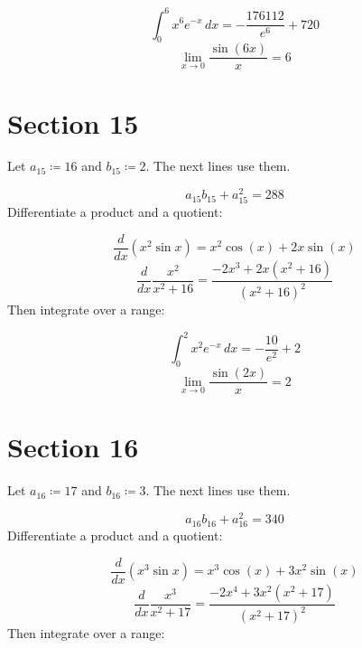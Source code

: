 \documentclass[11pt,a4paper]{article}
\theoremstyle{plain}
\theoremstyle{definition}
\theoremstyle{remark}
\begin{document}
\begin{equation*}
  \int_0^{6} x^{6} e^{-x} \, dx = -\frac{176112}{e^{6}} + 720
\end{equation*}
\begin{equation*}
  \lim_{x \to 0} \frac{\sin(6 x)}{x} = 6
\end{equation*}
\section*{Section 15}

Let $a_{15} \coloneqq  16$ and $b_{15} \coloneqq  2$. The next lines use them.

\begin{equation*}
  a_{15} b_{15} + a_{15}^2 = 288
\end{equation*}
Differentiate a product and a quotient:

\begin{equation*}
  \frac{d}{dx} \left( x^{2} \sin x \right) = x^{2} \cos\left(x\right) + 2 x \sin\left(x\right)
\end{equation*}
\begin{equation*}
  \frac{d}{dx} \frac{x^{2}}{x^2 + 16} = \frac{-2 x^{3} + 2 x \left(x^{2} + 16\right)}{\left(x^{2} + 16\right)^{2}}
\end{equation*}
Then integrate over a range:

\begin{equation*}
  \int_0^{2} x^{2} e^{-x} \, dx = -\frac{10}{e^{2}} + 2
\end{equation*}
\begin{equation*}
  \lim_{x \to 0} \frac{\sin(2 x)}{x} = 2
\end{equation*}
\section*{Section 16}

Let $a_{16} \coloneqq  17$ and $b_{16} \coloneqq  3$. The next lines use them.

\begin{equation*}
  a_{16} b_{16} + a_{16}^2 = 340
\end{equation*}
Differentiate a product and a quotient:

\begin{equation*}
  \frac{d}{dx} \left( x^{3} \sin x \right) = x^{3} \cos\left(x\right) + 3 x^{2} \sin\left(x\right)
\end{equation*}
\begin{equation*}
  \frac{d}{dx} \frac{x^{3}}{x^2 + 17} = \frac{-2 x^{4} + 3 x^{2} \left(x^{2} + 17\right)}{\left(x^{2} + 17\right)^{2}}
\end{equation*}
Then integrate over a range:
\end{document}
